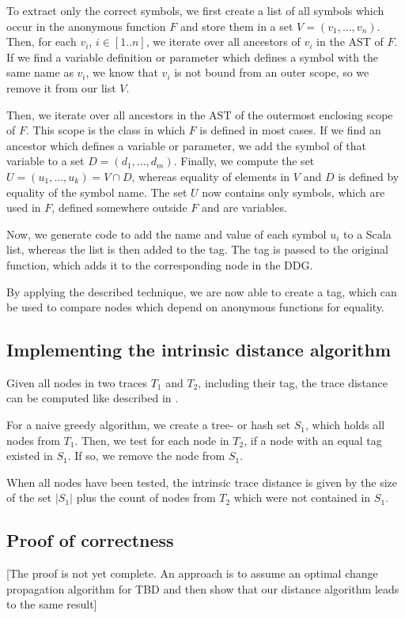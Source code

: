 To extract only the correct symbols, we first create a list of all symbols which occur in the anonymous function $F$ and store them in a set $V = (v_1, ..., v_n)$. Then, for each $v_i$, $i \in[1..n]$, we iterate over all ancestors of $v_i$ in the AST of $F$. If we find a variable definition or parameter which defines a symbol with the same name as $v_i$, we know that $v_i$ is not bound from an outer scope, so we remove it from our list $V$.

Then, we iterate over all ancestors in the AST of the outermost enclosing scope of $F$. This scope is the class in which $F$ is defined in most cases. If we find an ancestor which defines a variable or parameter, we add the symbol of that variable to a set $D = (d_1, ..., d_m)$. Finally, we compute the set $U = (u_1, ..., u_k) = V \cap D$, whereas equality of elements in $V$ and $D$ is defined by equality of the symbol name. The set $U$ now contains only symbols, which are used in $F$, defined somewhere outside $F$ and are variables. 

Now, we generate code to add the name and value of each symbol $u_i$ to a Scala list, whereas the list is then added to the tag. The tag is passed to the original function, which adds it to the corresponding node in the DDG.  

By applying the described technique, we are now able to create a tag, which can be used to compare nodes which depend on anonymous functions for equality. 

\subsection{Implementing the intrinsic distance algorithm}
Given all nodes in two traces $T_1$ and $T_2$, including their tag, the trace distance can be computed like described in \cite{Acar2005thesis}.  

For a naive greedy algorithm, we create a tree- or hash set $S_1$, which holds all nodes from $T_1$. Then, we test for each node in $T_2$, if a node with an equal tag existed in $S_1$. If so, we remove the node from $S_1$.

When all nodes have been tested, the intrinsic trace distance is given by the size of the set $|S_1|$ plus the count of nodes from $T_2$ which were not contained in $S_1$. 
\subsection{Proof of correctness}
[The proof is not yet complete. An approach is to assume an optimal change propagation algorithm for TBD and then show that our distance algorithm leads to the same result]